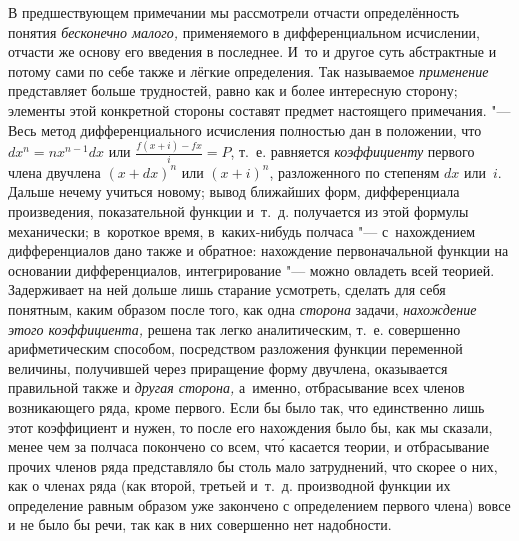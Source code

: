 В предшествующем примечании мы рассмотрели отчасти определённость понятия
{\em бесконечно малого,} применяемого в дифференциальном исчислении, отчасти же
основу его введения в последнее. И~то и другое суть абстрактные и потому сами
по себе также и лёгкие определения. Так называемое {\em применение}
представляет больше трудностей, равно как и более интересную сторону; элементы
этой конкретной стороны составят предмет настоящего примечания. "--- Весь метод
дифференциального исчисления полностью дан в положении, что $dx^n=nx^{n-1}dx$
или $\frac{f\left(x+i\right)-fx}i=P$, т.~е. равняется {\em коэффициенту}
первого члена двучлена $(x+dx)^n$ или $(x+i)^n$, разложенного по степеням $dx$ или~$i$. Дальше нечему учиться
новому; вывод ближайших форм, дифференциала произведения, показательной функции
и~т.~д. получается из этой формулы механически; в~короткое время,
в~каких-нибудь полчаса "--- с~нахождением дифференциалов дано также и обратное:
нахождение первоначальной функции на основании дифференциалов, интегрирование
"--- можно овладеть всей теорией. Задерживает на ней дольше лишь старание
усмотреть, сделать для себя понятным, каким образом после того, как одна
{\em сторона} задачи, {\em нахождение этого коэффициента,} решена так легко
аналитическим, т.~е. совершенно арифметическим способом, посредством разложения
функции переменной величины, получившей через приращение форму двучлена,
оказывается правильной также и {\em другая сторона,} а~именно, отбрасывание
всех членов возникающего ряда, кроме первого. Если бы было так, что
единственно лишь этот коэффициент и нужен, то после его нахождения было бы,
как мы сказали, менее чем за полчаса покончено со всем, чт\'{о} касается теории,
и отбрасывание прочих членов ряда представляло бы столь мало затруднений, что
скорее о них, как о членах ряда (как второй, третьей и~т.~д.
производной функции их определение равным образом уже закончено с определением
первого члена) вовсе и не было бы речи, так как в них совершенно нет надобности.

